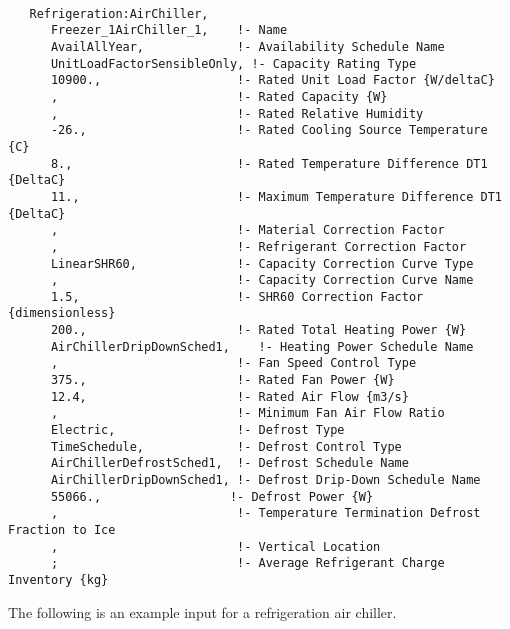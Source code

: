 \begin{lstlisting}

   Refrigeration:AirChiller,
      Freezer_1AirChiller_1,    !- Name
      AvailAllYear,             !- Availability Schedule Name
      UnitLoadFactorSensibleOnly, !- Capacity Rating Type
      10900.,                   !- Rated Unit Load Factor {W/deltaC}
      ,                         !- Rated Capacity {W}
      ,                         !- Rated Relative Humidity
      -26.,                     !- Rated Cooling Source Temperature {C}
      8.,                       !- Rated Temperature Difference DT1 {DeltaC}
      11.,                      !- Maximum Temperature Difference DT1 {DeltaC}
      ,                         !- Material Correction Factor
      ,                         !- Refrigerant Correction Factor
      LinearSHR60,              !- Capacity Correction Curve Type
      ,                         !- Capacity Correction Curve Name
      1.5,                      !- SHR60 Correction Factor {dimensionless}
      200.,                     !- Rated Total Heating Power {W}
      AirChillerDripDownSched1,    !- Heating Power Schedule Name
      ,                         !- Fan Speed Control Type
      375.,                     !- Rated Fan Power {W}
      12.4,                     !- Rated Air Flow {m3/s}
      ,                         !- Minimum Fan Air Flow Ratio
      Electric,                 !- Defrost Type
      TimeSchedule,             !- Defrost Control Type
      AirChillerDefrostSched1,  !- Defrost Schedule Name
      AirChillerDripDownSched1, !- Defrost Drip-Down Schedule Name
      55066.,                  !- Defrost Power {W}
      ,                         !- Temperature Termination Defrost Fraction to Ice
      ,                         !- Vertical Location
      ;                         !- Average Refrigerant Charge Inventory {kg}
\end{lstlisting}

The following is an example input for a refrigeration air chiller.

